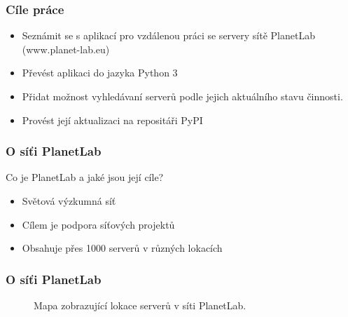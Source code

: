 \documentclass[%
  12pt,       				%
	t,                  %
	aspectratio=1610,   %
	unicode,						%
]{beamer}				    	%
\begin{document}
\vypninavigacnisymboly

\vytvortitulku

\begin{frame} 
	\frametitle{Cíle práce}
	\begin{itemize}
		\item Seznámit se s aplikací pro vzdálenou práci se servery sítě PlanetLab (www.planet-lab.eu)
		\item Převést aplikaci do jazyka Python 3
		\item Přidat možnost vyhledávaní serverů podle jejich aktuálního stavu činnosti.
		\item Provést její aktualizaci na repositáři PyPI
	\end{itemize}
\end{frame}

\begin{frame} 
	\frametitle{O síťi PlanetLab}
	Co je PlanetLab a jaké jsou její cíle?
\begin{itemize}
	\item Světová výzkumná síť
	\item Cílem je podpora síťových projektů
	\item Obsahuje přes 1000 serverů v různých lokacích
\end{itemize}
\end{frame} 

\begin{frame} 
\frametitle{O síťi PlanetLab}
\begin{figure}[H]
	\centering
	\caption{Mapa zobrazující lokace serverů v síti PlanetLab.}
	\label{fig:location}
\end{figure}
\end{frame}
\end{document}
